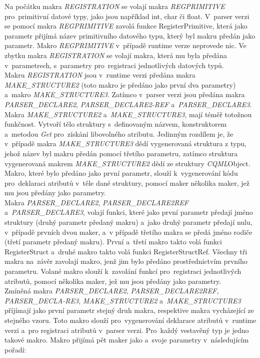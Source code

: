 \documentclass[11pt,twoside,a4paper]{book}
\begin{document}
Na počátku makra \textit{REGISTRATION} se volají makra \textit{REGPRIMITIVE} pro~primitivní datové typy, jako jsou například int, char či float. V~parser verzi se pomocí makra \textit{REGPRIMITIVE} zavolá funkce RegisterPrimitive, která jako parametr přijímá název primitivního datového typu, který byl makru předán jako parametr. Makro \textit{REGPRIMITIVE} v~případě runtime verze neprovede nic. Ve zbytku makra \textit{REGISTRATION} se volají makra, která mu byla předána v~parametrech, s~parametry pro~registraci jednotlivých datových typů.\\
Makru \textit{REGISTRATION} jsou v~runtime verzi předána makra \textit{MAKE\_STRUCTURE2} (toto makro je předáno jako první dva parametry) a~makro \textit{MAKE\_STRUCTURE3}. Zatímco v~parser verzi jsou předána makra \textit{PARSER\_DECLARE2}, \textit{PARSER\_DECLARE2-REF} a~\textit{PARSER\_DECLARE3}.\\
Makra \textit{MAKE\_STRUCTURE2} a~\textit{MAKE\_STRUCTURE3}, mají téměř totožnou funkčnost. Vytvoří tělo struktury s~definovaným názvem, konstruktorem a~metodou \textit{Get} pro~získání libovolného atributu. Jedinným rozdílem je, že v~případě makra \textit{MAKE\_STRUCTURE3} dědí vygenerovaná struktura z typu, jehož název byl makru předán pomocí třetího parametru, zatímco struktura vygenerovaná makrem \textit{MAKE\_STRUCTURE2} dědí ze struktury \textit{CQML}Object. Makro, které bylo předáno jako první parametr, slouží k~vygenerování kódu pro~deklaraci atributů v~těle dané struktury, pomocí maker několika maker, jež mu jsou předány jako parametry.\\
Makra \textit{PARSER\_DECLARE2}, \textit{PARSER\_DECLARE2REF} a~\textit{PARSER\_DECLARE3}, volají funkci, které jako první parametr předají jméno struktury (druhý parametr předaný makru) a~jako druhý parametr předají nulu, v~případě prvních dvou maker, a~v případě třetího makra se předá jméno rodiče (třetí parametr předaný makru). První a~třetí makro takto volá funkci RegisterStruct a~druhé makro takto volá funkci RegisterStructRef. Všechny tři makra na~závěr zavolají makro, jenž jim bylo předáno prostřednictvím prvního parametru. Volané makro slouží k~zavolání funkcí pro~registraci jednotlivých atributů, pomocí několika maker, jež mu jsou předány jako parametry.\\
Zmíněná makra \textit{PARSER\_DECLARE2}, \textit{PARSER\_DECLARE2REF}, \textit{PARSER\_DECLA-RE3}, \textit{MAKE\_STRUCTURE2} a~\textit{MAKE\_STRUCTURE3} příjímají jako první parametr stejný druh makra, respektive makra vycházející ze stejného vzoru. Toto makro slouží pro~vygenerování deklarace atributů v~runtime verzi a~pro registraci atributů v~parser verzi. Pro~každý vestavěný typ je jedno takové makro. Makro přijímá pět maker jako a~svoje parametry v~následujícím pořadí:
\end{document}
